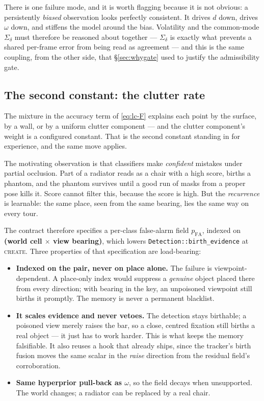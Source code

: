 \documentclass[11pt,a4paper]{report}
\newcommand{\stage}[1]{\textsc{#1}}
\newcommand{\Create}{\stage{create}}
\begin{document}
There is one failure mode, and it is worth flagging because it is not obvious: a persistently
\emph{biased} observation looks perfectly consistent. It drives $d$ down, drives $\omega$ down, and
stiffens the model around the bias. Volatility and the common-mode $\Sigma_\delta$ must therefore be
reasoned about together --- $\Sigma_\delta$ is exactly what prevents a shared per-frame error from
being read as agreement --- and this is the same coupling, from the other side, that
\S\ref{sec:whygate} used to justify the admissibility gate.

\subsection{The second constant: the clutter rate}
\label{sec:pfa}

The mixture in the accuracy term of \eqref{eq:lc-F} explains each point by the surface, by a wall, or
by a uniform clutter component --- and the clutter component's weight is a configured constant. That
is the second constant standing in for experience, and the same move applies.

The motivating observation is that classifiers make \emph{confident} mistakes under partial
occlusion. Part of a radiator reads as a chair with a high score, births a phantom, and the phantom
survives until a good run of masks from a proper pose kills it. Score cannot filter this, because the
score is high. But the \emph{recurrence} is learnable: the same place, seen from the same bearing,
lies the same way on every tour.

The contract therefore specifies a per-class false-alarm field $p_{\mathrm{FA}}$, indexed on
\textbf{(world cell $\times$ view bearing)}, which lowers \texttt{Detection::birth\_evidence} at
\Create. Three properties of that specification are load-bearing:

\begin{itemize}[leftmargin=1.4em,itemsep=3pt]
\item \textbf{Indexed on the pair, never on place alone.} The failure is viewpoint-dependent. A
      place-only index would suppress a \emph{genuine} object placed there from every direction;
      with bearing in the key, an unpoisoned viewpoint still births it promptly. The memory is
      never a permanent blacklist.
\item \textbf{It scales evidence and never vetoes.} The detection stays birthable; a poisoned view
      merely raises the bar, so a close, centred fixation still births a real object --- it just has
      to work harder. This is what keeps the memory falsifiable. It also reuses a hook that already
      ships, since the tracker's birth fusion moves the same scalar in the \emph{raise} direction
      from the residual field's corroboration.
\item \textbf{Same hyperprior pull-back as $\omega$}, so the field decays when unsupported. The
      world changes; a radiator can be replaced by a real chair.
\end{itemize}
\end{document}
